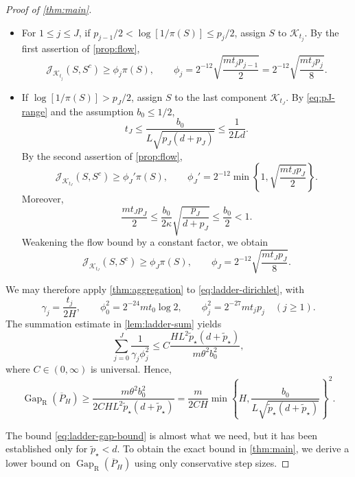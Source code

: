 \documentclass[11pt]{article}
\newcommand{\Gap}{\operatorname{Gap}_{\mathrm{R}}}
\newcommand{\cK}{\mathcal K}
\newcommand{\1}{\mathbf 1}
\begin{document}
\begin{proof}[Proof of \cref{thm:main}]
\begin{itemize}[leftmargin=2em]
			\item For \(1\leq j\leq J\), if
			\(p_{j-1}/2<\log[1/\pi(S)]\leq p_j/2\), assign \(S\) to \(\cK_{t_j}\).
			By the first assertion of \cref{prop:flow},
			\[
			\mathcal{J}_{\cK_{t_j}}(S,S^c)
			\geq
			\phi_j\pi(S),
			\qquad
			\phi_j=2^{-12} \sqrt{\frac{m t_jp_{j-1}}{2}}= 2^{-12} \sqrt{\frac{m t_jp_j}{8}}.
			\]
			
			\item If \(\log[1/\pi(S)]>p_J/2\), assign \(S\) to the last component
			\(\cK_{t_J}\).  By \eqref{eq:pJ-range} and the assumption $b_0\leq1/2$,
			\[
			t_J
			\leq
			\frac{b_0}{L\sqrt{p_J(d+p_J)}}
			\leq
			\frac{1}{2Ld}.
			\]
			By the second assertion of \cref{prop:flow}, 
			\[
			\mathcal{J}_{\cK_{t_J}}(S,S^c)
			\geq
			\phi_J' \pi(S),
			\qquad
			\phi_J'= 2^{-12}  \min \left\{1, \sqrt{\frac{m t_Jp_J}{2}} \right\}.
			\]
			Moreover,
			\[
			\frac{mt_Jp_J}{2}
			\leq\frac{b_0}{2\kappa}\sqrt{\frac{p_J}{d+p_J}}
			\leq\frac{b_0}{2}<1.
			\]
			Weakening the flow bound by a constant factor, we obtain
			\[
			\mathcal{J}_{\cK_{t_J}}(S,S^c)
			\geq
			\phi_J \pi(S),
			\qquad
			\phi_J= 2^{-12}  \sqrt{\frac{m t_Jp_J}{8}}.
			\]
		\end{itemize}
		
		We may therefore apply \cref{thm:aggregation} to 
		\eqref{eq:ladder-dirichlet}, with
		\[
		\gamma_j=\frac{t_j}{2H},
		\qquad
		\phi_0^2= 2^{-24} m t_0\log 2,
		\qquad
		\phi_j^2= 2^{-27} m t_jp_j\quad(j\geq1).
		\]
		The summation estimate in \cref{lem:ladder-sum} yields
		\begin{equation*}
			\sum_{j=0}^J\frac1{\gamma_j\phi_j^2}
			\leq
			C\frac{HL^2 \widetilde p_\star (d+ \widetilde p_\star )}
			{m\theta^2b_0^2},
		\end{equation*}
		where \(C \in (0,\infty)\) is universal.  Hence,
		\begin{equation}\label{eq:ladder-gap-bound}
			\Gap(\overline P_H)
			\geq
			\frac{m\theta^2b_0^2}
			{2CHL^2 \widetilde p_\star (d+ \widetilde p_\star )}
			=
			\frac{m}{2CH}
			\min\left\{
			H,
			\frac{b_0}{L\sqrt{ \widetilde p_\star (d+ \widetilde p_\star )}}
			\right\}^{2}.
		\end{equation}
		
		\bigskip
		
		
		The bound \eqref{eq:ladder-gap-bound} is almost what we need, but it has been
		established only for $ \widetilde p_\star <d$.  To obtain the exact bound in
		\cref{thm:main}, we derive a lower bound on $\Gap(\overline P_H)$ using only
		conservative step sizes.
		

\end{proof}
\end{document}
